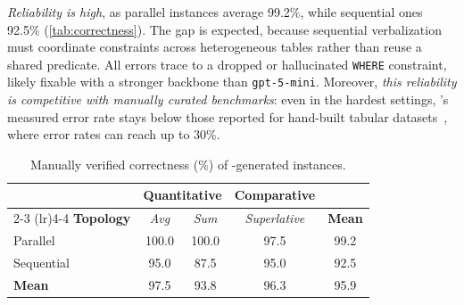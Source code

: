 \emph{Reliability is high}, as parallel instances average 99.2\%, while sequential ones 92.5\% (\autoref{tab:correctness}). The gap is expected, because sequential verbalization must coordinate constraints across heterogeneous tables rather than reuse a shared predicate. All errors trace to a dropped or hallucinated \texttt{WHERE} constraint, likely fixable with a stronger backbone than \texttt{gpt-5-mini}. Moreover, \emph{this reliability is competitive with manually curated benchmarks}: even in the hardest settings, 
\name's measured error rate stays below those reported for hand-built tabular datasets~\cite{5.8}, where error rates can reach up to 30\%. 
\begin{table}[t!]
\centering
\small
\setlength{\tabcolsep}{0.55em}
\renewcommand{\arraystretch}{1.2}
\begin{tabular}{l ccc c}
\toprule
& \multicolumn{2}{c}{\textbf{Quantitative}} & \textbf{Comparative} & \\
\cmidrule(lr){2-3} \cmidrule(lr){4-4}
\textbf{Topology} & \textit{Avg} & \textit{Sum} & \textit{Superlative} & \textbf{Mean} \\
\midrule
Parallel    & 100.0 & 100.0 & 97.5 & 99.2 \\
Sequential  &  95.0 &  87.5 & 95.0 & 92.5 \\
\midrule
\textbf{Mean} & 97.5 & 93.8 & 96.3 & 95.9 \\
\bottomrule
\end{tabular}
\caption{Manually verified correctness (\%) of \name-generated instances.}
\label{tab:correctness}
\end{table} 
